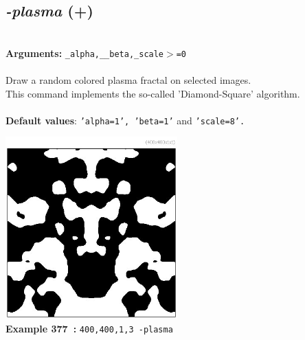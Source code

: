 \documentclass[a4paper,11pt,twoside]{book}
\begin{document}
\subsection{\emph{-plasma} (+)}\vspace*{-0.5em}
~\\\textbf{Arguments: } 
{\small \texttt{\_alpha,\_\_beta,\_scale$>$=0}}\\~\\
Draw a random colored plasma fractal on selected images.
~\\This command implements the so-called 'Diamond-Square' algorithm.
~\\~\\\textbf{Default values}: {\small \texttt{'alpha=1', 'beta=1'} and \texttt{'scale=8'.}}
\begin{center}\includegraphics[keepaspectratio=true,height=7cm,width=\textwidth]{img/gmic_def377.jpg}\\
{\footnotesize \textbf{Example 377~:} \texttt{400,400,1,3 -plasma}}
\end{center}
\end{document}
